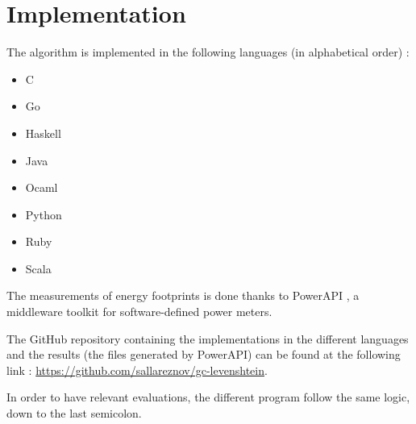 \section{Implementation}
\label{sec:Implementation}
The algorithm is implemented in the following languages (in alphabetical order) :
\begin{multicols}{2}
	\begin{itemize}
		\item C
		\item Go
		\item Haskell
		\item Java
		\item Ocaml
		\item Python
		\item Ruby
		\item Scala
	\end{itemize}
\end{multicols}

The measurements of energy footprints is done thanks to PowerAPI \cite{powerapi-website}\cite{powerapi-github}, a middleware toolkit for software-defined power meters.

The GitHub repository containing the implementations in the different languages and the results (the files generated by PowerAPI) can be found at the following link : \url{https://github.com/sallareznov/gc-levenshtein}.

In order to have relevant evaluations, the different program follow the same logic, down to the last semicolon.
